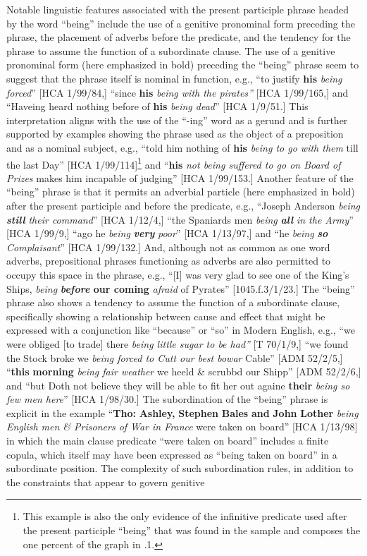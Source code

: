   Notable linguistic features associated with the present participle phrase headed by the word “being” include the use of a genitive pronominal form preceding the phrase, the placement of adverbs before the predicate, and the tendency for the phrase to assume the function of a subordinate clause. The use of a genitive pronominal form (here emphasized in bold) preceding the “being” phrase seem to suggest that the phrase itself is nominal in function, e.g., “to justify \textbf{his} \textit{being forced}” [HCA 1/99/84,] “since \textbf{his} \textit{being with the pirates”} [HCA 1/99/165,] and “Haveing heard nothing before of \textbf{his} \textit{being dead}” [HCA 1/9/51.] This interpretation aligns with the use of the “-ing” word as a gerund and is further supported by examples showing the phrase used as the object of a preposition and as a nominal subject, e.g., “told him nothing of \textbf{his} \textit{being to go with them} till the last Day” [HCA 1/99/114]\footnote{This example is also the only evidence of the infinitive predicate used after the present participle “being” that was found in the sample and composes the one percent of the graph in .1.}  and “\textbf{his} \textit{not being suffered to go on Board of Prizes} makes him incapable of judging” [HCA 1/99/153.]  Another feature of the “being” phrase is that it permits an adverbial particle (here emphasized in bold) after the present participle and before the predicate, e.g., “Joseph Anderson \textit{being} \textbf{\textit{still}} \textit{their command}” [HCA 1/12/4,] “the Spaniards men \textit{being} \textbf{\textit{all}} \textit{in the Army}” [HCA 1/99/9,] “ago he \textit{being} \textbf{\textit{very}} \textit{poor}” [HCA 1/13/97,] and “he \textit{being} \textbf{\textit{so}} \textit{Complaisant}” [HCA 1/99/132.] And, although not as common as one word adverbs, prepositional phrases functioning as adverbs are also permitted to occupy this space in the phrase, e.g., “[I] was very glad to see one of the King’s Ships, \textit{being} \textbf{\textit{before} \textbf{our} \textbf{coming}} \textit{afraid} of Pyrates” [1045.f.3/1/23.] The “being” phrase also shows a tendency to assume the function of a subordinate clause, specifically showing a relationship between cause and effect that might be expressed with a conjunction like “because” or “so” in Modern English, e.g., “we were obliged [to trade] there \textit{being little sugar to be had”} [T 70/1/9,] “we found the Stock broke we \textit{being forced to Cutt our best bowar} Cable” [ADM 52/2/5,] “\textbf{this} \textbf{morning} \textit{being fair weather} we heeld \& scrubbd our Shipp” [ADM 52/2/6,] and “but Doth not believe they will be able to fit her out againe \textbf{their} \textit{being so few men here}” [HCA 1/98/30.] The subordination of the “being” phrase is explicit in the example “\textbf{Tho:} \textbf{Ashley,} \textbf{Stephen} \textbf{Bales} \textbf{and} \textbf{John} \textbf{Lother} \textit{being English men \& Prisoners of War in France} were taken on board” [HCA 1/13/98] in which the main clause predicate “were taken on board” includes a finite copula, which itself may have been expressed as “being taken on board” in a subordinate position. The complexity of such subordination rules, in addition to the constraints that appear to govern genitive 